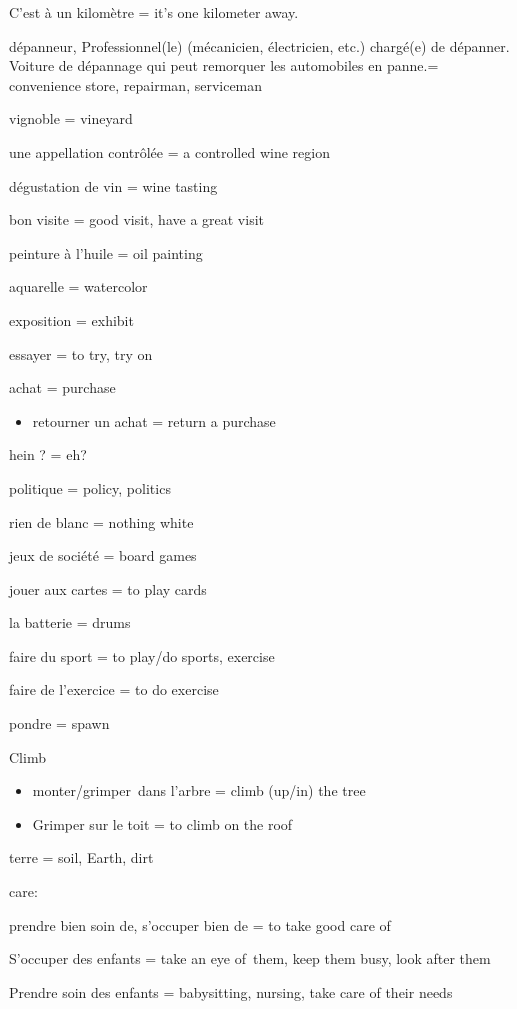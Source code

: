 C'est à un kilomètre = it's one kilometer away.

dépanneur, Professionnel(le) (mécanicien, électricien, etc.) chargé(e)
de dépanner. Voiture de dépannage qui peut remorquer les automobiles en
panne.= convenience store, repairman, serviceman

vignoble = vineyard

une appellation contrôlée = a controlled wine region

dégustation de vin = wine tasting

bon visite = good visit, have a great visit

peinture à l'huile = oil painting

aquarelle = watercolor

exposition = exhibit

essayer = to try, try on

achat = purchase

\begin{itemize}
\item
  retourner un achat = return a purchase
\end{itemize}

hein ? = eh?

politique = policy, politics

rien de blanc = nothing white

jeux de société = board games

jouer aux cartes = to play cards

la batterie = drums

faire du sport = to play/do sports, exercise

faire de l'exercice = to do exercise

pondre = spawn

Climb

\begin{itemize}
\item
  monter/grimper~dans l'arbre = climb (up/in) the tree
\item
  Grimper sur le toit = to climb on the roof
\end{itemize}

terre = soil, Earth, dirt

care:

prendre bien soin de, s'occuper bien de = to take good care of

S'occuper des enfants = take an eye of~them, keep them busy, look after
them

Prendre soin des enfants = babysitting, nursing, take care of their
needs~

